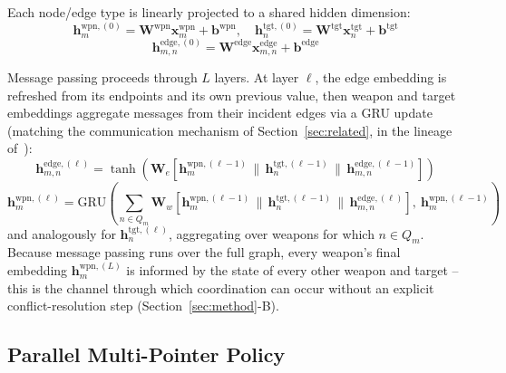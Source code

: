 \documentclass{ieeeaccess}
\begin{document}
Each node/edge type is linearly projected to a shared hidden dimension:
\begin{equation}
\bm{h}_m^{\text{wpn},(0)} = \bm{W}^{\text{wpn}}\bm{x}_m^{\text{wpn}} + \bm{b}^{\text{wpn}}, \quad
\bm{h}_n^{\text{tgt},(0)} = \bm{W}^{\text{tgt}}\bm{x}_n^{\text{tgt}} + \bm{b}^{\text{tgt}}
\end{equation}
\begin{equation}
\bm{h}_{m,n}^{\text{edge},(0)} = \bm{W}^{\text{edge}}\bm{x}_{m,n}^{\text{edge}} + \bm{b}^{\text{edge}}
\end{equation}

Message passing proceeds through $L$ layers. At layer $\ell$, the edge embedding is refreshed from its endpoints and its own previous value, then weapon and target embeddings aggregate messages from their incident edges via a GRU update (matching the communication mechanism of Section~\ref{sec:related}, in the lineage of~\cite{sukhbaatar2016commnet,das2019tarmac}):
\begin{equation}
\bm{h}_{m,n}^{\text{edge},(\ell)} = \tanh\!\left(\bm{W}_e\left[\bm{h}_m^{\text{wpn},(\ell-1)} \,\|\, \bm{h}_n^{\text{tgt},(\ell-1)} \,\|\, \bm{h}_{m,n}^{\text{edge},(\ell-1)}\right]\right)
\end{equation}
\begin{equation}
\bm{h}_m^{\text{wpn},(\ell)} = \text{GRU}\!\left(\textstyle\sum_{n \in Q_m} \bm{W}_w\left[\bm{h}_m^{\text{wpn},(\ell-1)} \,\|\, \bm{h}_n^{\text{tgt},(\ell-1)} \,\|\, \bm{h}_{m,n}^{\text{edge},(\ell)}\right],\ \bm{h}_m^{\text{wpn},(\ell-1)}\right)
\end{equation}
and analogously for $\bm{h}_n^{\text{tgt},(\ell)}$, aggregating over weapons for which $n \in Q_m$. Because message passing runs over the full graph, every weapon's final embedding $\bm{h}_m^{\text{wpn},(L)}$ is informed by the state of every other weapon and target -- this is the channel through which coordination can occur without an explicit conflict-resolution step (Section~\ref{sec:method}-B).

\subsection{Parallel Multi-Pointer Policy}
\label{sec:parallel-decoder}
\end{document}
